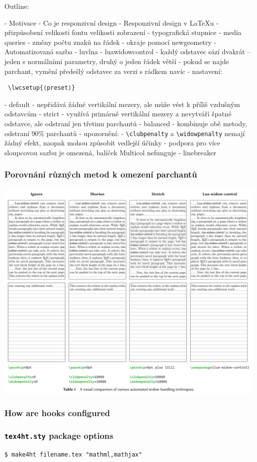 
Outline:

- Motivace
- Co je responzivní design
- Responzivní design v LaTeXu
  - přizpůsobení velikosti fontu velikosti zobrazení
  - typografická stupnice
  - media queries
    - změny počtu znaků na řádek
    - okraje pomocí newgeometry
- Automatizovaná sazba
  - luvlna
  - luawidowcontrol
    - každý odstavec sází dvakrát -- jeden s normálními parametry, druhý o jeden řádek větší
    - pokud se najde parchant, vymění předešlý odstavec za verzi s rádkem navíc
    - nastavení:
 \begin{verbatim}
 \lwcsetup{⟨preset⟩}
 \end{verbatim}
      - default - nepřidává žádné vertikální mezery, ale může vést k příliš vzdušným odstavcům
      - strict - využívá primárně vertikální mezery a nevytváří špatné odstavce,  ale odstraní jen třetinu parchantů
      - balanced - kombinuje obě metody, odstraní 90\% parchantů
    - upozornění:
      - \verb|\clubpenalty| a \verb|\widowpenalty| nemají žádný efekt, naopak mohou způsobit vedlejší účinky
      - podpora pro více sloupcovou sazbu je omezená, balíček Multicol nefunguje
  - linebreaker

 
\begin{frame}
  \frametitle{Porovnání různých metod k omezení parchantů}
  \begin{center}
  \includegraphics[height=.95\textheight]{img/lua-widow.pdf}
  \end{center}
\end{frame}



\begin{frame}
  \frametitle{How are hooks configured}
  \begin{itemize}

\end{itemize}
\end{frame}

\begin{frame}[fragile]
  \frametitle{\texttt{tex4ht.sty} package options}
  \begin{priklad}
\begin{verbatim}
$ make4ht filename.tex "mathml,mathjax"
\end{verbatim}
\end{priklad}
\end{frame}
